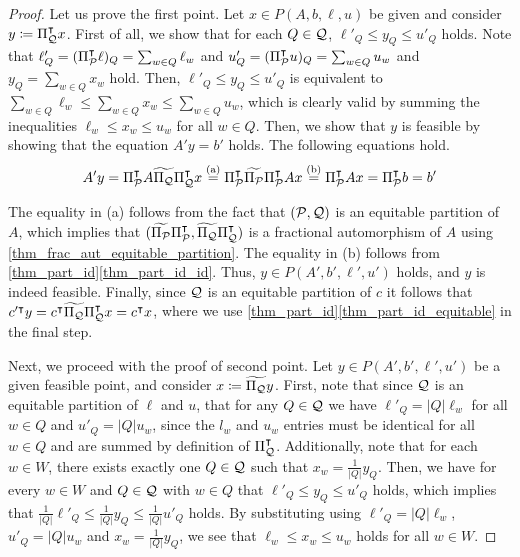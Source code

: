\documentclass[pdflatex,sn-mathphys-num]{sn-jnl}%
\theoremstyle{thmstyleone}%
\theoremstyle{thmstylethree}%
\theoremstyle{thmstyletwo}%
\begin{document}
\begin{proof}
    Let us prove the first point. Let $x\in P(A,b,\ell,u)$ be given and consider $y\coloneqq \transpose{\Pi_{\MQ}} x$. First of all, we show that for each $Q\in \mathcal{Q}$, $\ell'_Q \leq y_Q \leq u'_Q$ holds. Note that  $\ell'_Q = (\Pi_{\mathcal{P}}^{\intercal} \ell)_Q = \sum_{w\in Q} \ell_w$ and $u'_Q = (\Pi_{\mathcal{P}}^{\intercal} u)_Q = \sum_{w\in Q} u_w$ and $y_Q  = \sum_{w\in Q} x_w$ hold. Then, $\ell'_Q \leq y_Q \leq u'_Q$ is equivalent to $\sum_{w\in Q}\ell_w \leq \sum_{w\in Q} x_w \leq  \sum_{w\in Q} u_w$, which is clearly valid by summing the inequalities $\ell_w \leq x_w \leq u_w$ for all $w\in Q$. Then, we show that $y$ is feasible by showing that the equation $A' y = b'$ holds. The following equations hold.
    \begin{equation*}
        A' y = \Pi_{\mathcal{P}}^{\intercal} A \widetilde{\Pi_{\mathcal{Q}}} \Pi_{\mathcal{Q}}^{\intercal} x \stackrel{\textup{(a)}}{=} \Pi_{\mathcal{P}}^{\intercal} \widetilde{\Pi_{\mathcal{P}}} \Pi_{\mathcal{P}}^{\intercal}  A x \stackrel{\textup{(b)}}{=} \Pi_{\mathcal{P}}^{\intercal}  A x = \Pi_{\mathcal{P}}^{\intercal}  b = b' 
    \end{equation*}

    The equality in \textup{(a)} follows from the fact that $(\mathcal{P},\mathcal{Q})$ is an equitable partition of $A$, which implies that $(\widetilde{\Pi_{\mathcal{P}}} \Pi_{\mathcal{P}}^{\intercal}, \widetilde{\Pi_{\mathcal{Q}}} \Pi_{\mathcal{Q}}^{\intercal})$ is a fractional automorphism of $A$ using \cref{thm_frac_aut_equitable_partition}. The equality in \textup{(b)} follows from \cref{thm_part_id}\ref{thm_part_id_id}. Thus, $y\in P(A',b',\ell',u')$ holds, and $y$ is indeed feasible. Finally, since $\mathcal{Q}$ is an equitable partition of $c$ it follows that $c'^{\intercal} y = c^{\intercal} \widetilde{\Pi_{\mathcal{Q}}} \Pi_{\mathcal{Q}}^{\intercal} x = c^{\intercal} x$, where we use \cref{thm_part_id}\ref{thm_part_id_equitable} in the final step.

    Next, we proceed with the proof of second point. Let $y\in P(A',b',\ell',u')$ be a given feasible point, and consider $x\coloneqq \widetilde{\Pi_\MQ} y$.  
    First, note that since $\mathcal{Q}$ is an equitable partition of $\ell$ and $u$, that for any $Q\in \mathcal{Q}$ we have $\ell'_Q = |Q| \ell_w$ for all $w\in Q$ and $u'_Q = |Q| u_w$, since the $l_w$ and $u_w$ entries must be identical for all $w\in Q$ and are summed by definition of $\Pi_{\mathcal{Q}}^{\intercal}$. Additionally, note that for each $w\in W$, there exists exactly one $Q\in \mathcal{Q}$ such that $x_w = \frac{1}{|Q|} y_Q$. 
    Then, we have for every $w\in W$ and $Q\in \mathcal{Q}$ with $w\in Q$ that $\ell'_Q \leq y_Q \leq u'_Q$ holds, which implies that $\frac{1}{|Q|} \ell'_Q \leq \frac{1}{|Q|} y_Q \leq \frac{1}{|Q|} u'_Q$ holds. By substituting using $\ell'_Q = |Q| \ell_w$, $u'_Q = |Q| u_w$ and $x_w = \frac{1}{|Q|} y_Q$, we see that $\ell_w \leq x_w \leq u_w$ holds for all $w\in W$.
    

\end{proof}
\end{document}
